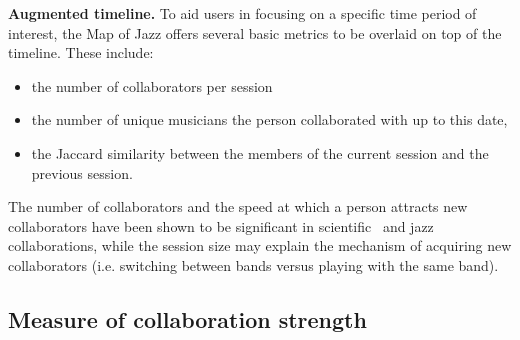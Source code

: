 \documentclass[12pt]{cmuthesis}
\begin{document}
  
  \textbf{Augmented timeline.} To aid users in focusing on a specific time period of interest, the Map of Jazz offers several basic metrics to be overlaid on top of the timeline. These include: 
  \begin{itemize}
    \item the number of collaborators per session
    \item the number of unique musicians the person collaborated with up to this date,
    \item the Jaccard similarity between the members of the current session and the previous session.
  \end{itemize}
  The number of collaborators and the speed at which a person attracts new collaborators have been shown to be significant in scientific~\cite{Petersen2012} and jazz~\cite{Pinheiro2009} collaborations, while the session size may explain the mechanism of acquiring new collaborators (i.e. switching between bands versus playing with the same band).



  \subsection{Measure of collaboration strength}
\end{document}
